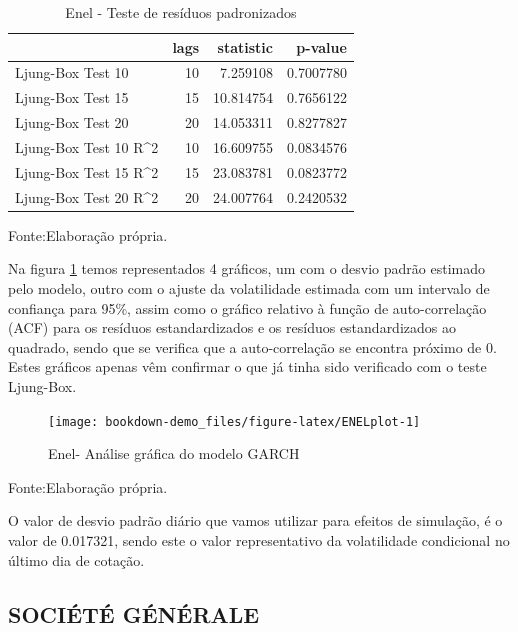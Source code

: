 \documentclass[
  12pt,
  a4paper,
  openany]{book}
\theoremstyle{definition}
\theoremstyle{definition}
\theoremstyle{definition}
\theoremstyle{remark}
\begin{document}
\begin{table}[!h]

\caption{\label{tab:ENELLjunk}Enel - Teste de resíduos padronizados}
\centering
\begin{tabular}[t]{lrrr}
\toprule
  & lags & statistic & p-value\\
\midrule
Ljung-Box Test 10 & 10 & 7.259108 & 0.7007780\\
Ljung-Box Test 15 & 15 & 10.814754 & 0.7656122\\
Ljung-Box Test 20 & 20 & 14.053311 & 0.8277827\\
Ljung-Box Test 10 R\textasciicircum{}2 & 10 & 16.609755 & 0.0834576\\
Ljung-Box Test 15 R\textasciicircum{}2 & 15 & 23.083781 & 0.0823772\\
\addlinespace
Ljung-Box Test 20 R\textasciicircum{}2 & 20 & 24.007764 & 0.2420532\\
\bottomrule
\end{tabular}
\end{table}
\FloatBarrier
\centering

Fonte:Elaboração própria.

\justifying
\bigskip

Na figura \ref{fig:ENELplot} temos representados 4 gráficos, um com o desvio padrão estimado pelo modelo, outro com o ajuste da volatilidade estimada com um intervalo de confiança para 95\%, assim como o gráfico relativo à função de auto-correlação (ACF) para os resíduos estandardizados e os resíduos estandardizados ao quadrado, sendo que se verifica que a auto-correlação se encontra próximo de 0. Estes gráficos apenas vêm confirmar o que já tinha sido verificado com o teste Ljung-Box.

\begin{figure}

{\centering \texttt{[image: bookdown-demo\_files/figure-latex/ENELplot-1]} 

}

\caption{Enel- Análise gráfica do modelo GARCH}\label{fig:ENELplot}
\end{figure}
\FloatBarrier
\centering

Fonte:Elaboração própria.

\justifying
\bigskip

O valor de desvio padrão diário que vamos utilizar para efeitos de simulação, é o valor de 0.017321, sendo este o valor representativo da volatilidade condicional no último dia de cotação.

\hypertarget{sociuxe9tuxe9-guxe9nuxe9rale}{%
\subsection{SOCIÉTÉ GÉNÉRALE}\label{sociuxe9tuxe9-guxe9nuxe9rale}}
\end{document}
